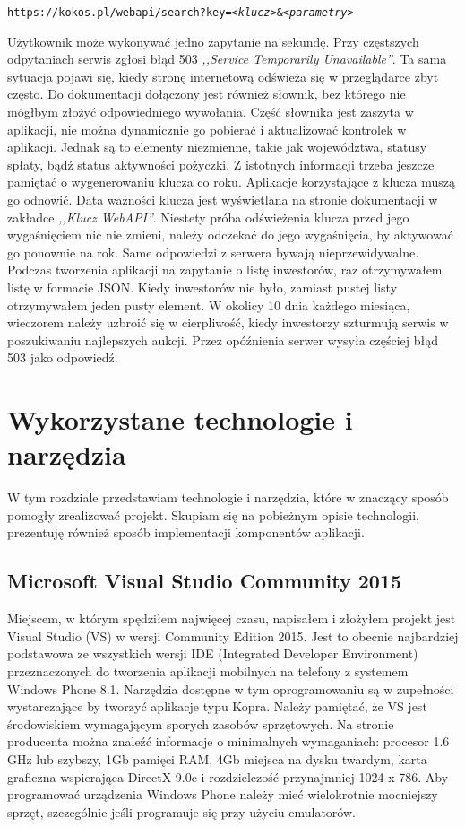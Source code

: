 \documentclass[a4paper,twoside,titlepage,openright]{book}
\begin{document}
\begin{center}
\texttt{https://kokos.pl/webapi/search?key=\textit{<klucz>}\&\textit{<parametry>}}
\end{center}

Użytkownik może wykonywać jedno zapytanie na sekundę. Przy częstszych odpytaniach serwis zgłosi błąd 503 \textit{,,Service Temporarily Unavailable''}. Ta sama sytuacja pojawi się, kiedy stronę internetową odświeża się w przeglądarce zbyt często. Do dokumentacji dołączony jest również słownik, bez którego nie mógłbym złożyć odpowiedniego wywołania. Część słownika jest zaszyta w aplikacji, nie można dynamicznie go pobierać i aktualizować kontrolek w aplikacji. Jednak są to elementy niezmienne, takie jak województwa, statusy spłaty, bądź status aktywności pożyczki. Z istotnych informacji trzeba jeszcze pamiętać o wygenerowaniu klucza co roku. Aplikacje korzystające z klucza muszą go odnowić. Data ważności klucza jest wyświetlana na stronie dokumentacji w zakładce \textit{,,Klucz WebAPI''}. Niestety próba odświeżenia klucza przed jego wygaśnięciem nic nie zmieni, należy odczekać do jego wygaśnięcia, by aktywować go ponownie na rok. Same odpowiedzi z serwera bywają nieprzewidywalne. Podczas tworzenia aplikacji na zapytanie o listę inwestorów, raz otrzymywałem listę w formacie JSON. Kiedy inwestorów nie było, zamiast pustej listy otrzymywałem jeden pusty element. W okolicy 10 dnia każdego miesiąca, wieczorem należy uzbroić się w cierpliwość, kiedy inwestorzy szturmują serwis w poszukiwaniu najlepszych aukcji. Przez opóźnienia serwer wysyła częściej błąd 503 jako odpowiedź. 


\clearpage{\pagestyle{empty}\cleardoublepage}
\chapter{Wykorzystane technologie i narzędzia}
W tym rozdziale przedstawiam technologie i narzędzia, które w znaczący sposób pomogły zrealizować projekt. Skupiam się na pobieżnym opisie technologii, prezentuję również sposób implementacji komponentów aplikacji.

\section{Microsoft Visual Studio Community 2015}
Miejscem, w którym spędziłem najwięcej czasu, napisałem i złożyłem projekt jest Visual Studio (VS) w wersji Community Edition 2015. Jest to obecnie najbardziej podstawowa ze wszystkich wersji IDE (Integrated Developer Environment) przeznaczonych do tworzenia aplikacji mobilnych na telefony z systemem Windows Phone 8.1. Narzędzia dostępne w tym oprogramowaniu są w zupełności wystarczające by tworzyć aplikacje typu Kopra. Należy pamiętać, że VS jest środowiskiem wymagającym sporych zasobów sprzętowych. Na stronie producenta \cite{vs} można znaleźć informacje o minimalnych wymaganiach: procesor 1.6 GHz lub szybszy, 1Gb pamięci RAM, 4Gb miejsca na dysku twardym, karta graficzna wspierająca DirectX 9.0c i rozdzielczość przynajmniej 1024 x 786. Aby programować urządzenia Windows Phone należy mieć wielokrotnie mocniejszy sprzęt, szczególnie jeśli programuje się przy użyciu emulatorów.
\end{document}
